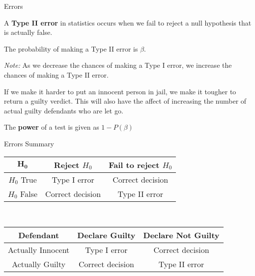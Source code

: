 \documentclass[t]{beamer}
\begin{document}
\begin{frame}{Errors}
\begin{tcolorbox}[colframe=green!20!black, colback = green!30!white,title={\textbf{Type II Error}}]
A \textbf{Type II error} in statistics occurs when we fail to reject a null hypothesis that is actually false.
\end{tcolorbox}
\bigskip	\pause

The probability of making a Type II error is $\beta$.	\newline\\ \pause

\emph{Note:} As we decrease the chances of making a Type I error, we increase the chances of making a Type II error. \newline\\	\pause

If we make it harder to put an innocent person in jail, we make it tougher to return a guilty verdict. This will also have the affect of increasing the number of actual guilty defendants who are let go.	\newline\\	\pause

The \textbf{power} of a test is given as $1 - P(\beta)$
\end{frame}

\begin{frame}{Errors Summary}
\begin{center}
\begin{tabular}{c|cc}
$\bm{H_0}$ & Reject $H_0$ & Fail to reject $H_0$ \\ \hline
$H_0$ True & Type I error & Correct decision \\
$H_0$ False & Correct decision & Type II error \\
\end{tabular} 
\\[1cm]
\begin{tabular}{c|cc}
\textbf{Defendant} & Declare Guilty & Declare Not Guilty \\ \hline
Actually Innocent & Type I error & Correct decision \\
Actually Guilty & Correct decision & Type II error \\
\end{tabular}
\end{center}
\end{frame}
\end{document}
